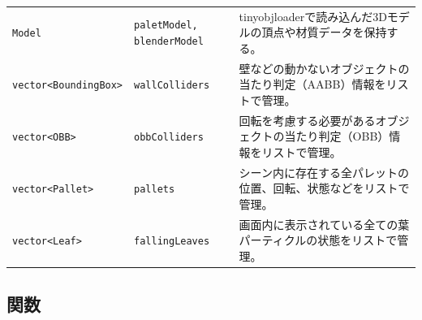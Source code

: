 \documentclass[upIatex,dvipdfmx,a4paper]{jsarticle}
\begin{document}
\begin{table}[H]
\begin{tabular}{p{4cm}p{4cm}p{8cm}}
        \texttt{Model} & \texttt{paletModel, blenderModel} & tinyobjloaderで読み込んだ3Dモデルの頂点や材質データを保持する。 \\
        \texttt{vector<BoundingBox>} & \texttt{wallColliders} & 壁などの動かないオブジェクトの当たり判定（AABB）情報をリストで管理。 \\
        \texttt{vector<OBB>} & \texttt{obbColliders} & 回転を考慮する必要があるオブジェクトの当たり判定（OBB）情報をリストで管理。 \\
        \texttt{vector<Pallet>} & \texttt{pallets} & シーン内に存在する全パレットの位置、回転、状態などをリストで管理。 \\
        \texttt{vector<Leaf>} & \texttt{fallingLeaves} & 画面内に表示されている全ての葉パーティクルの状態をリストで管理。 \\
        \bottomrule
    \end{tabular}
\end{table}
\subsection{関数}
\end{document}
